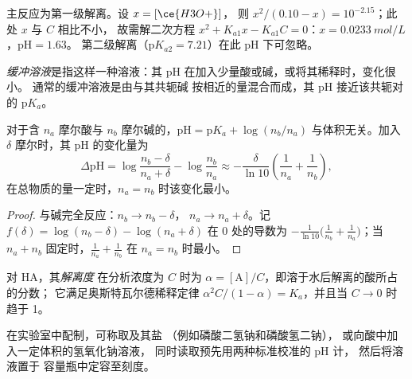 \begin{example}\label{ex:b1:predominant-reaction:h3po4}
主反应为第一级解离。设 $x = [\ce{H3O+}]$，
则 $x^2/(0.10 - x) = 10^{-2.15}$；此处 $x$ 与 $C$ 相比不小，
故需解二次方程 $x^2 + K_{a1}x - K_{a1}C = 0$：$x =
\qty{0.0233}{mol/L}$，$\mathrm{pH} = 1.63$。
第二级解离（$\mathrm{p}K_{a2} = 7.21$）在此 pH 下可忽略。
\end{example}

\begin{definition}[缓冲溶液]\label{def:b1:predominant-reaction:buffer}
\emph{缓冲溶液}是指这样一种溶液：其 pH
在加入少量酸或碱，或将其稀释时，变化很小。
通常的缓冲溶液是由与其共轭碱
按相近的量混合而成，其 pH 接近该共轭对的
$\mathrm{p}K_a$。
\end{definition}

\begin{proposition}[缓冲溶液为何能抵抗酸碱]\label{prop:b1:predominant-reaction:buffer}
对于含 $n_a$ 摩尔酸与 $n_b$ 摩尔碱的，$\mathrm{pH} =
\mathrm{p}K_a + \log(n_b/n_a)$ 与体积无关。加入
$\delta$ 摩尔时，其 pH 的变化量为
\[
  \Delta\mathrm{pH} = \log\frac{n_b - \delta}{n_a + \delta} - \log\frac{n_b}{n_a}
  \approx -\frac{\delta}{\ln 10}\left(\frac{1}{n_a} + \frac{1}{n_b}\right),
\]
在总物质的量一定时，$n_a = n_b$ 时该变化最小。
\end{proposition}

\begin{proof}
与碱完全反应：$n_b \to n_b - \delta$，
$n_a \to n_a + \delta$。记 $f(\delta) = \log(n_b - \delta) -
\log(n_a + \delta)$ 在 0 处的导数为 $-\frac{1}{\ln10}\big(\frac{1}{n_b} +
\frac{1}{n_a}\big)$；当 $n_a + n_b$ 固定时，$\frac1{n_a} + \frac1{n_b}$ 在
$n_a = n_b$ 时最小。
\end{proof}

\begin{definition}[解离度]\label{def:b1:predominant-reaction:dissociation}
对 HA，其\emph{解离度}
在分析浓度为 $C$ 时为 $\alpha = [\mathrm{A}]/C$，即溶于水后解离的酸所占的分数；
它满足奥斯特瓦尔德稀释定律
$\alpha^2C/(1 - \alpha) = K_a$，并且当 $C \to 0$ 时趋于 1。
\end{definition}

\begin{inthelab}[配制缓冲溶液]
在实验室中配制，可称取及其盐
（例如磷酸二氢钠和磷酸氢二钠），
或向酸中加入一定体积的氢氧化钠溶液，
同时读取预先用两种标准校准的 pH 计，
然后将溶液置于
容量瓶中定容至刻度。
\end{inthelab}

